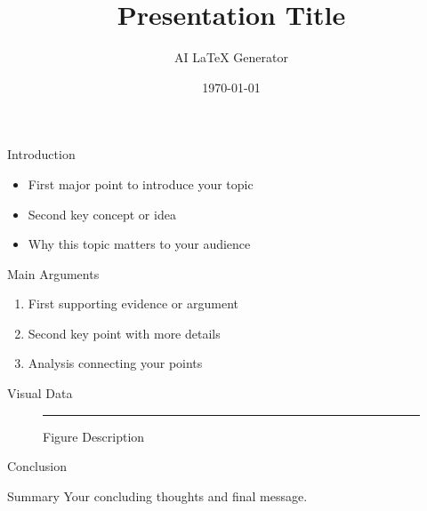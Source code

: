 \documentclass{beamer}
\title{Presentation Title}
\author{AI LaTeX Generator}
\date{\today}
\begin{document}
\begin{frame}
\titlepage
\end{frame}

\begin{frame}{Introduction}
\begin{itemize}
    \item First major point to introduce your topic
    \item Second key concept or idea
    \item Why this topic matters to your audience
\end{itemize}
\end{frame}

\begin{frame}{Main Arguments}
\begin{enumerate}
    \item First supporting evidence or argument
    \item Second key point with more details
    \item Analysis connecting your points
\end{enumerate}
\end{frame}

\begin{frame}{Visual Data}
\begin{figure}
    \centering
    \rule{8cm}{6cm}
    \caption{Figure Description}
\end{figure}
\end{frame}

\begin{frame}{Conclusion}
\begin{block}{Summary}
    Your concluding thoughts and final message.
\end{block}
\end{frame}
\end{document}
